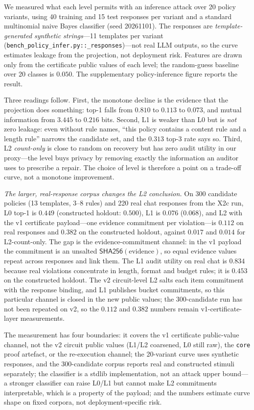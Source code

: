 \documentclass[10pt,journal,compsoc]{IEEEtran}
\begin{document}
We measured what each level permits with an inference attack over 20 policy
variants, using 40 training and 15 test responses per variant and a standard
multinomial naive Bayes classifier (seed 20261101). The responses are
\emph{template-generated synthetic strings}---11 templates per variant
(\texttt{bench\_policy\_infer.py::\_responses})---not real LLM outputs, so the
curve estimates leakage from the projection, not deployment risk. Features are
drawn only from the certificate public values of each level; the random-guess
baseline over 20 classes is $0.050$. The supplementary policy-inference figure reports the result.



Three readings follow. First, the monotone decline is the evidence that the
projection does something: top-1 falls from $0.810$ to $0.113$ to $0.073$, and
mutual information from $3.445$ to $0.216$ bits. Second, L1 is weaker than L0
but is \emph{not} zero leakage: even without rule names, ``this policy contains a
content rule and a length rule'' narrows the candidate set, and the $0.313$
top-3 rate says so. Third, L2 \emph{count-only} is close to random on recovery but has zero audit
utility in our proxy---the level buys privacy by removing exactly the
information an auditor uses to prescribe a repair. The choice of level is
therefore a point on a trade-off curve, not a monotone improvement.

\emph{The larger, real-response corpus changes the L2 conclusion.} On 300
candidate policies (13 templates, 3--8 rules) and 220 real chat responses from
the X2c run, L0 top-1 is $0.449$ (constructed holdout: $0.500$), L1 is
$0.076$ ($0.068$), and L2 with the v1 certificate payload---one evidence
commitment per violation---is $0.112$ on real responses and $0.382$ on the
constructed holdout, against $0.017$ and $0.014$ for L2-count-only. The gap is
the evidence-commitment channel: in the v1 payload the commitment is an
unsalted $\mathsf{SHA256}(\text{evidence})$, so equal evidence values repeat
across responses and link them. The L1 audit utility on real chat is $0.834$
because real violations concentrate in length, format and budget rules; it is
$0.453$ on the constructed holdout. The v2 circuit-level L2 salts each item
commitment with the response binding, and L1 publishes bucket commitments, so
this particular channel is closed in the new public values; the 300-candidate
run has not been repeated on v2, so the $0.112$ and $0.382$ numbers remain
v1-certificate-layer measurements.

The measurement has four boundaries: it covers the v1 certificate public-value
channel, not the v2 circuit public values (L1/L2 coarsened, L0 still raw), the
\texttt{core} proof artefact, or the re-execution channel; the 20-variant curve
uses synthetic
responses, and the 300-candidate corpus reports real and constructed stimuli
separately; the classifier is a stdlib implementation, not an attack upper
bound---a stronger classifier can raise L0/L1 but cannot make L2 commitments
interpretable, which is a property of the payload; and the numbers estimate
curve shape on fixed corpora, not deployment-specific risk.
\end{document}

